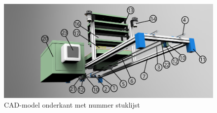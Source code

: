 \documentclass[a4paper,twoside,kulak]{kulakreport} %
\begin{document}
\begin{figure}[h]
	\centering
	\includegraphics[width=\textwidth]{renderingOnderaanStuklijst.png}
	\caption{CAD-model onderkant met nummer stuklijst}
	\label{fig: renderingOnderkantStuklijst}
	
\end{figure} 

		
\end{document}
